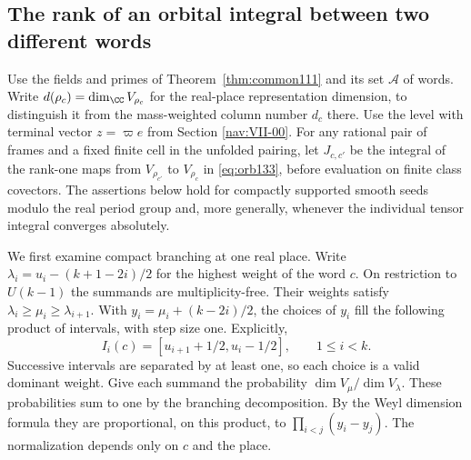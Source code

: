 \documentclass[a4paper,11pt]{article}
\theoremstyle{definition}
\theoremstyle{remark}
\numberwithin{equation}{section}
\begin{document}
\subsection{The rank of an orbital integral between two different words}\label{nav:IX-01}
Use the fields and primes of Theorem~\ref{thm:common111} and its
set \(\mathcal A\) of words. Write \(d(\rho_c)=\dim_\CC V_{\rho_c}\)
for the real-place representation dimension, to distinguish it
from the mass-weighted column number \(d_c\) there. Use the level
with terminal vector \(z=\varpi e\) from
Section \ref{nav:VII-00}.
For any rational pair of frames and a fixed finite cell in the
unfolded pairing, let \(J_{c,c'}\) be the integral of the
rank-one maps from \(V_{\rho_{c'}}\) to \(V_{\rho_c}\) in \eqref{eq:orb133}, before evaluation on finite class
covectors. The assertions below hold for compactly supported
smooth seeds modulo the real period group and, more generally,
whenever the individual tensor integral converges absolutely.

We first examine compact branching at one real place. Write
\(\lambda_i=u_i-(k+1-2i)/2\) for the highest weight of the
word \(c\). On restriction to \(U(k-1)\) the summands are
multiplicity-free. Their weights satisfy
\(\lambda_i\ge\mu_i\ge\lambda_{i+1}\). With
\(y_i=\mu_i+(k-2i)/2\), the choices of \(y_i\) fill the
following product of intervals, with step size one. Explicitly,
\[
    I_i(c)=[u_{i+1}+1/2,u_i-1/2],\qquad 1\le i<k .
\]
Successive intervals are separated by at least one, so each
choice is a valid dominant weight. Give each summand the
probability \(\dim V_\mu/\dim V_{\lambda}\). These probabilities
sum to one by the branching decomposition. By the Weyl dimension
formula they are proportional, on this product, to
\(\prod_{i<j}(y_i-y_j)\). The normalization depends only on \(c\)
and the place.
\end{document}
